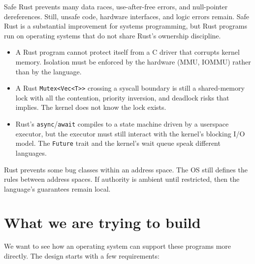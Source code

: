 Safe Rust prevents many data races, use-after-free errors, and null-pointer
dereferences. Still, unsafe code, hardware interfaces, and logic errors remain.
Safe Rust is a substantial improvement for systems programming, but Rust
programs run on operating systems that do not share Rust's ownership discipline.

\begin{itemize}
    \item A Rust program cannot protect itself from a C driver that
        corrupts kernel memory. Isolation must be enforced by the hardware
        (MMU, IOMMU) rather than by the language.
    \item A Rust \texttt{Mutex<Vec<T>{>}} crossing a syscall boundary is
        still a shared-memory lock with all the contention, priority inversion,
        and deadlock risks that implies. The kernel does not know the lock exists.
    \item Rust's \texttt{async}/\texttt{await} compiles to a state machine
        driven by a userspace executor, but the executor must still interact with
        the kernel's blocking I/O model. The \texttt{Future} trait and the
        kernel's wait queue speak different languages.
\end{itemize}

Rust prevents some bug classes within an address space. The OS still defines the
rules between address spaces. If authority is ambient until restricted, then the
language's guarantees remain local.

\section{What we are trying to build}

We want to see how an operating system can support these programs more directly.
The design starts with a few requirements:

